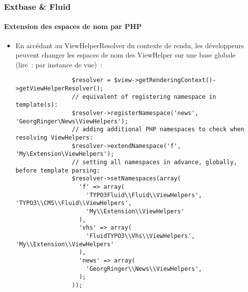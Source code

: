 \begin{frame}[fragile]
	\frametitle{Extbase \& Fluid}
	\framesubtitle{Extension des espaces de nom par PHP}

	\lstset{basicstyle=\tiny\ttfamily}

	\begin{itemize}

		\item En accédant au ViewHelperResolver du contexte de rendu,
			les développeurs peuvent changer les espaces de nom des ViewHelper
			sur une base globale (lire~: par instance de vue)~:

			\begin{lstlisting}
				$resolver = $view->getRenderingContext()->getViewHelperResolver();
				// equivalent of registering namespace in template(s):
				$resolver->registerNamespace('news', 'GeorgRinger\News\ViewHelpers');
				// adding additional PHP namespaces to check when resolving ViewHelpers:
				$resolver->extendNamespace('f', 'My\Extension\ViewHelpers');
				// setting all namespaces in advance, globally, before template parsing:
				$resolver->setNamespaces(array(
				  'f' => array(
				    'TYPO3Fluid\\Fluid\\ViewHelpers', 'TYPO3\\CMS\\Fluid\\ViewHelpers',
				    'My\\Extension\\ViewHelpers'
				  ),
				  'vhs' => array(
				    'FluidTYPO3\\Vhs\\ViewHelpers', 'My\\Extension\\ViewHelpers'
				  ),
				  'news' => array(
				    'GeorgRinger\\News\\ViewHelpers',
				  );
				));
			\end{lstlisting}
	\end{itemize}

\end{frame}


